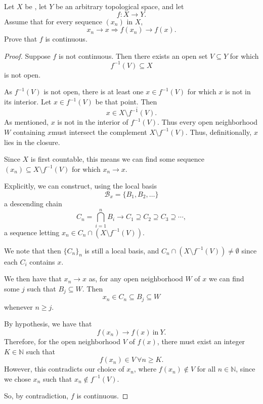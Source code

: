 \documentclass[11pt]{article}
\begin{document}
\begin{prob}
    Let $X$ be , let 
    $Y$ be an arbitrary topological space, and let 
    \[
        f : X \to Y. 
    \]
    Assume that for every sequence $(x_n)$ in $X$, 
    \[
        x_n \to x \Rightarrow f(x_n) \to f(x). 
    \]
    Prove that $f$ is continuous. 
\end{prob}
\begin{proof}
    Suppose $f$ is not continuous. 
    Then there exists an open set $V\subseteq Y$ for 
    which 
    \[
        f^{-1}(V) \subseteq X 
    \]
    is not open. 

    As $f^{-1}(V)$ is not open, 
    there is at least one $x \in f^{-1}(V)$ for 
    which $x$ is not in its interior. 
    Let $x \in f^{-1}(V)$ be that point. Then 
    \[
        x\in \overline{X \setminus f^{-1}(V)}. 
    \]
    As mentioned, $x$ is not in the interior of $f^{-1}(V)$. 
    Thus every open neighborhood $W$ containing 
    $x$must intersect the complement 
    $X \setminus f^{-1}(V)$. 
    Thus, definitionally, $x$ lies in the closure. 

    Since $X$ is first countable, this means 
    we can find some sequence $(x_n) \subseteq 
    X \setminus f^{-1}(V)$ for which $x_n \to x$. 
    
    Explicitly, we can construct, using the local basis 
    \[
        \mathcal B_x = \{B_1,B_2,\ldots\}
    \]
    a descending chain 
    \[
        C_n = \bigcap_{i=1}^n B_i 
        \rightarrow C_1 \supseteq C_2 \supseteq 
        C_3 \supseteq \cdots, 
    \]
    a sequence 
    letting $x_n \in C_n \cap (X \setminus f^{-1}(V))$. 

    We note that then $\{C_n\}_n$ is still a local basis, 
    and $C_n \cap (X \setminus f^{-1}(V)) \neq \emptyset$ 
    since 
    each $C_i$ contains $x$. 

    We then have that $x_n \to x$ as, for any 
    open neighborhood $W$ of $x$ we can find 
    some $j$ such that $B_j \subseteq W$. 
    Then 
    \[
        x_n \in C_n \subseteq B_j \subseteq W
    \] 
    whenever $n \geq j$. 

    By hypothesis, we have that 
    \[
        f(x_n) \to f(x) \ \text{in} \ Y. 
    \]
    Therefore, for the open neighborhood $V$ of 
    $f(x)$, there must exist an integer $K \in \mathbb N$ 
    such that 
    \[
        f(x_n) \in V \ \forall n \geq K. 
    \]
    However, this contradicts our choice of 
    $x_n$, where $f(x_n) \not\in V$ for 
    all $n \in \mathbb N$, since 
    we chose $x_n$ such that 
    $x_n \not\in f^{-1}(V)$. 

    So, by contradiction, $f$ is continuous.
    
    
\end{proof}
\end{document}
